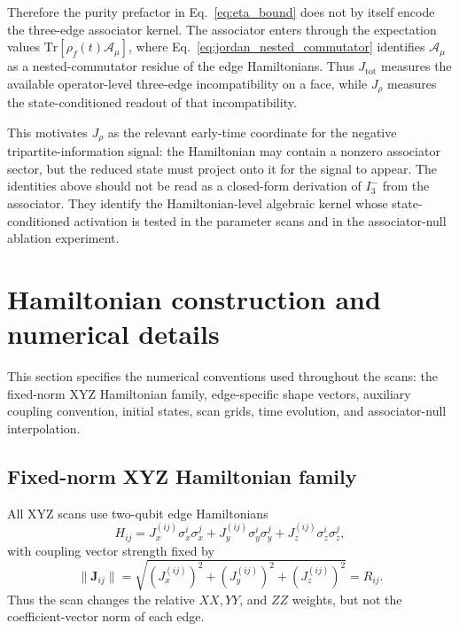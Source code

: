 \documentclass[aps,physrev,preprint,groupedaddress]{revtex4-2}
\begin{document}
Therefore the purity prefactor in Eq.~\eqref{eq:eta_bound} does not by itself encode the three-edge associator kernel. The associator enters through the expectation values ${\mathrm{Tr}}[\rho_f(t)\mathcal{A}_\mu]$, where Eq.~\eqref{eq:jordan_nested_commutator} identifies $\mathcal{A}_\mu$ as a nested-commutator residue of the edge Hamiltonians. Thus $J_{\mathrm{tot}}$ measures the available operator-level three-edge incompatibility on a face, while $J_\rho$ measures the state-conditioned readout of that incompatibility.

This motivates $J_\rho$ as the relevant early-time coordinate for the negative tripartite-information signal: the Hamiltonian may contain a nonzero associator sector, but the reduced state must project onto it for the signal to appear. The identities above should not be read as a closed-form derivation of $I_3^-$ from the associator. They identify the Hamiltonian-level algebraic kernel whose state-conditioned activation is tested in the parameter scans and in the associator-null ablation experiment.

\section{Hamiltonian construction and numerical details}\label{sm:numerics}
This section specifies the numerical conventions used throughout the scans: the fixed-norm XYZ Hamiltonian family, edge-specific shape vectors, auxiliary coupling convention, initial states, scan grids, time evolution, and associator-null interpolation.

\subsection{Fixed-norm XYZ Hamiltonian family}\label{sm:numerics-xyz}

All XYZ scans use two-qubit edge Hamiltonians
\begin{equation}
    H_{ij} = J_x^{(ij)}\sigma_x^i\sigma_x^j + J_y^{(ij)}\sigma_y^i\sigma_y^j + J_z^{(ij)}\sigma_z^i\sigma_z^j,
\end{equation}
with coupling vector strength fixed by
\begin{equation}
    \lVert\mathbf{J}_{ij}\rVert = \sqrt{(J_x^{(ij)})^2+(J_y^{(ij)})^2+(J_z^{(ij)})^2}=R_{ij}.
\end{equation}
Thus the scan changes the relative $XX, YY$, and $ZZ$ weights, but not the coefficient-vector norm of each edge.
\end{document}
